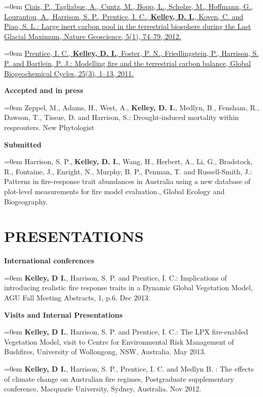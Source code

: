 \documentclass[paper=a4,fontsize=11pt]{scrartcl}	 			%
\newcommand{\sepspace}{\vspace*{0em}}			%
\newcommand{\NewPart}[1]{\vspace*{-0.5em} \section*{\uppercase{#1}} \vspace*{-0.75em} }
\newcommand{\BibEntry}[2]{
		\vspace*{-1em} \noindent \textbf{#1} \hfill \par					%
		\hangindent=0em\hangafter=0 \small #2} 	%
\begin{document}
\BibEntry{} {\href{http://www.nature.com/ngeo/journal/v5/n1/full/ngeo1324.html}{Ciais, P., Tagliabue, A., Cuntz, M., Bopp, L., Scholze, M., Hoffmann, G., Lourantou, A., Harrison, S. P., Prentice, I. C., \textbf{Kelley, D. I.}, Koven, C. and Piao, S. L.: Large inert carbon pool in the terrestrial biosphere during the Last Glacial Maximum, Nature Geoscience, 5(1), 74--79, 2012.}}


\BibEntry{} {\href{http://onlinelibrary.wiley.com/doi/10.1029/2010GB003906/abstract}{Prentice, I. C., \textbf{Kelley, D. I.}, Foster, P. N., Friedlingstein, P., Harrison, S. P. and Bartlein, P. J.: Modelling fire and the terrestrial carbon balance, Global Biogeochemical Cycles, 25(3), 1--13, 2011.}}
\sepspace

\BibEntry{\newline \newline Accepted and in press}{Zeppel, M., Adams, H., West, A., \textbf{Kelley, D. I.}, Medlyn, B., Fensham, R., Dawson, T., Tissue, D. and Harrison, S.: Drought-induced mortality within resprouters. New Phytologist}

\BibEntry{\newline \newline Submitted} {Harrison, S. P., \textbf{Kelley, D. I.}, Wang, H., Herbert, A., Li, G., Bradstock, R., Fontaine, J., Enright, N., Murphy, B. P., Penman, T. and Russell-Smith, J.: Patterns in fire-response trait abundances in Australia using a new database of plot-level measurements for fire model evaluation., Global Ecology and Biogeography.}


\NewPart{Presentations}
\BibEntry{\newline International conferences} {\textbf{Kelley, D I.}, Harrison, S. P. and Prentice, I. C.: Implications of introducing realistic fire response traits in a Dynamic Global Vegetation Model, AGU Fall Meeting Abstracts, 1,  p.6. Dec 2013.}
\sepspace

\BibEntry{\newline \newline  Visits and Internal Presentations} {\textbf{Kelley, D I.}, Harrison, S. P. and Prentice, I. C.: The LPX fire-enabled Vegetation Model, visit to Centre for Environmental Risk Management of Bushfires, University of Wollongong, NSW, Australia. May 2013.}

\BibEntry{} {\textbf{Kelley, D I.}, Harrison, S. P., Prentice, I. C. and Medlyn B. : The effects of climate change on Australian fire regimes, Postgraduate supplementary conference, Macquarie University, Sydney, Australia. Nov 2012.}
\end{document}
